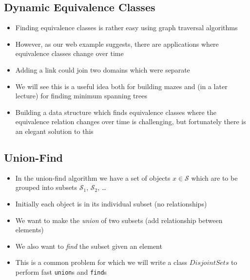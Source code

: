 
\begin{slide}
\section[-1]{Dynamic Equivalence Classes}

\begin{PauseHighLight}
  \begin{itemize}
  \item Finding equivalence classes is rather easy using graph traversal
    algorithms\pause
  \item However, as our web example suggests, there are applications
    where equivalence classes change over time\pause
  \item Adding a link could join two domains which were separate\pause
  \item We will see this is a useful idea both for building mazes
    and (in a later lecture) for finding minimum spanning trees\pause
  \item Building a data structure which finds equivalence classes where
    the equivalence relation changes over time is challenging\pause,
    but fortunately there is an elegant solution to this\pauseb
  \end{itemize}
\end{PauseHighLight}


\end{slide}



\Outline %

\begin{slide}
\section{Union-Find}

\begin{PauseHighLight}
  \begin{itemize}
  \item In the union-find algorithm we have a set of objects $x \in 
    \mathcal{S}$ which are to be grouped into subsets $\mathcal{S}_1$,
    $\mathcal{S}_2$, \ldots\pause
  \item Initially each object is in its individual subset (no relationships)\pause
  \item We want to make the \emph{union} of two subsets (add
    relationship between elements)\pause
  \item We also want to \emph{find} the subset given an element\pause
  \item This is a common problem for which we will write a class
  \jl$DisjointSets$ to perform fast \texttt{union}s and \texttt{find}s\pause
  \end{itemize}
\end{PauseHighLight}

\end{slide}

